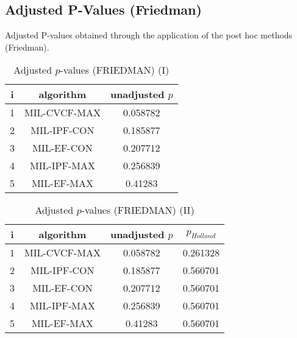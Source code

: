 \documentclass[a4paper,10pt]{article}
\begin{document}
\begin{landscape}
\newpage

\section{Adjusted P-Values (Friedman)}


Adjusted P-values obtained through the application of the post hoc methods (Friedman).

\begin{table}[!htp]
\centering\small
\begin{tabular}{ccc}
i&algorithm&unadjusted $p$\\
\hline1&MIL-CVCF-MAX&0.058782\\2&MIL-IPF-CON&0.185877\\3&MIL-EF-CON&0.207712\\4&MIL-IPF-MAX&0.256839\\5&MIL-EF-MAX&0.41283\\\hline
\end{tabular}
\caption{Adjusted $p$-values (FRIEDMAN) (I)}
\end{table}
\begin{table}[!htp]
\centering\small
\begin{tabular}{cccc}
i&algorithm&unadjusted $p$&$p_{Holland}$\\
\hline1&MIL-CVCF-MAX&0.058782&0.261328\\2&MIL-IPF-CON&0.185877&0.560701\\3&MIL-EF-CON&0.207712&0.560701\\4&MIL-IPF-MAX&0.256839&0.560701\\5&MIL-EF-MAX&0.41283&0.560701\\\hline
\end{tabular}
\caption{Adjusted $p$-values (FRIEDMAN) (II)}
\end{table}

\newpage
\end{landscape}
\end{document}
